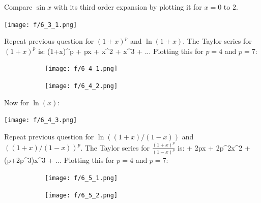 \ee
\item Compare $\sin x$ with its third order expansion by plotting it for $x=0$ to $2$.
\begin{center}
\texttt{[image: f/6\_3\_1.png]}
\end{center}
\item Repeat previous question for $(1+x)^{p}$ and $\ln(1+x)$.
\newline The Taylor series for $(1+x)^p$ is:
\be
(1+x)^p  + px + x^2 + x^3 + ...
\ee
Plotting this for $p = 4$ and $p = 7$:
\begin{figure}[h!]
\begin{center}
\begin{subfigure}[h]{.46\textwidth}
    \begin{center}
    \texttt{[image: f/6\_4\_1.png]}
    \end{center}
\end{subfigure}
\begin{subfigure}[h]{.48\textwidth}
    \begin{center}
    \texttt{[image: f/6\_4\_2.png]}
    \end{center}
\end{subfigure}
\end{center}
\end{figure}
Now for $\ln{(x)}$:
\begin{center}
\texttt{[image: f/6\_4\_3.png]}
\end{center}
\item Repeat previous question for $\ln((1+x)/(1-x))$ and $((1+x)/(1-x))^p$.
\newline The Taylor series for $\frac{(1+x)^p}{(1-x)^p}$ is:
\be
{}  + 2px + 2p^2x^2 + \left(p+2p^3\right)x^3 + ...
\ee
Plotting this for $p = 4$ and $p = 7$:
\begin{figure}[h!]
\begin{center}
\begin{subfigure}[h]{.46\textwidth}
    \begin{center}
    \texttt{[image: f/6\_5\_1.png]}
    \end{center}
\end{subfigure}
\begin{subfigure}[h]{.48\textwidth}
    \begin{center}
    \texttt{[image: f/6\_5\_2.png]}
    \end{center}
\end{subfigure}
\end{center}
\end{figure}
